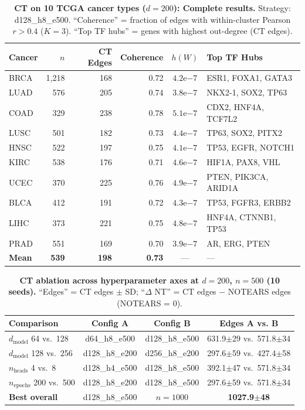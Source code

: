 \documentclass[12pt,a4paper]{article}
\begin{document}
\newpage
\begin{table}[H]
\centering
\caption{\textbf{CT on 10 TCGA cancer types ($d=200$): Complete results.} Strategy: d128\_h8\_e500. ``Coherence'' = fraction of edges with within-cluster Pearson $r > 0.4$ ($K=3$). ``Top TF hubs'' = genes with highest out-degree (CT edges).}
\label{tab:s_tcga_ct}
\small
\begin{tabular}{lrrrcl}
\toprule
Cancer & $n$ & CT Edges & Coherence & $h(W)$ & Top TF Hubs \\
\midrule
BRCA & 1,218 & 168 & 0.72 & $4.2$e$-7$ & ESR1, FOXA1, GATA3 \\
LUAD & 576 & 205 & 0.74 & $3.8$e$-7$ & NKX2-1, SOX2, TP63 \\
COAD & 329 & 238 & 0.78 & $5.1$e$-7$ & CDX2, HNF4A, TCF7L2 \\
LUSC & 501 & 182 & 0.73 & $4.4$e$-7$ & TP63, SOX2, PITX2 \\
HNSC & 522 & 197 & 0.75 & $4.1$e$-7$ & TP53, EGFR, NOTCH1 \\
KIRC & 538 & 176 & 0.71 & $4.6$e$-7$ & HIF1A, PAX8, VHL \\
UCEC & 370 & 225 & 0.76 & $4.9$e$-7$ & PTEN, PIK3CA, ARID1A \\
BLCA & 412 & 191 & 0.72 & $4.3$e$-7$ & TP53, FGFR3, ERBB2 \\
LIHC & 373 & 221 & 0.75 & $4.8$e$-7$ & HNF4A, CTNNB1, TP53 \\
PRAD & 551 & 169 & 0.70 & $3.9$e$-7$ & AR, ERG, PTEN \\
\midrule
\textbf{Mean} & \textbf{539} & \textbf{198} & \textbf{0.73} & --- & --- \\
\bottomrule
\end{tabular}
\end{table}
\newpage
\begin{table}[H]
\centering
\caption{\textbf{CT ablation across hyperparameter axes at $d=200$, $n=500$ (10 seeds).} ``Edges'' = CT edges $\pm$ SD; ``$\Delta$ NT'' = CT edges $-$ NOTEARS edges (NOTEARS = 0).}
\label{tab:s_ct_ablation}
\small
\begin{tabular}{lccc}
\toprule
Comparison & Config A & Config B & Edges A vs. B \\
\midrule
$d_{\text{model}}$ 64 vs.\ 128 & d64\_h8\_e500 & d128\_h8\_e500 & 631.9$\pm$29 vs.\ 571.8$\pm$34 \\
$d_{\text{model}}$ 128 vs.\ 256 & d128\_h8\_e200 & d256\_h8\_e200 & 297.6$\pm$59 vs.\ 427.4$\pm$58 \\
$n_{\text{heads}}$ 4 vs.\ 8 & d128\_h4\_e500 & d128\_h8\_e500 & 392.1$\pm$47 vs.\ 571.8$\pm$34 \\
$n_{\text{epochs}}$ 200 vs.\ 500 & d128\_h8\_e200 & d128\_h8\_e500 & 297.6$\pm$59 vs.\ 571.8$\pm$34 \\
\midrule
\textbf{Best overall} & d128\_h8\_e500 & $n=1000$ & \textbf{1027.9$\pm$48} \\
\bottomrule
\end{tabular}
\end{table}
\end{document}
